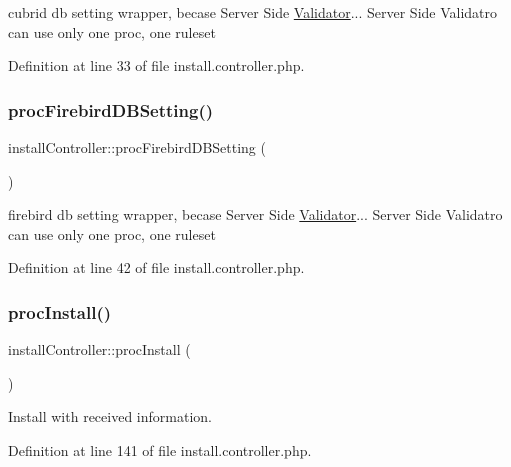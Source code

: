 cubrid db setting wrapper, becase Server Side \hyperlink{classValidator}{Validator}... Server Side Validatro can use only one proc, one ruleset 



Definition at line 33 of file install.\+controller.\+php.

\hypertarget{classinstallController_a243cf71fa5653d7cbf2d5583effefb95}{}\label{classinstallController_a243cf71fa5653d7cbf2d5583effefb95} 
\subsubsection{\texorpdfstring{proc\+Firebird\+D\+B\+Setting()}{procFirebirdDBSetting()}}
{\footnotesize\ttfamily install\+Controller\+::proc\+Firebird\+D\+B\+Setting (\begin{DoxyParamCaption}{ }\end{DoxyParamCaption})}



firebird db setting wrapper, becase Server Side \hyperlink{classValidator}{Validator}... Server Side Validatro can use only one proc, one ruleset 



Definition at line 42 of file install.\+controller.\+php.

\hypertarget{classinstallController_a41026755146b829fe87b83bca3962938}{}\label{classinstallController_a41026755146b829fe87b83bca3962938} 
\subsubsection{\texorpdfstring{proc\+Install()}{procInstall()}}
{\footnotesize\ttfamily install\+Controller\+::proc\+Install (\begin{DoxyParamCaption}{ }\end{DoxyParamCaption})}



Install with received information. 



Definition at line 141 of file install.\+controller.\+php.

\hypertarget{classinstallController_aebbed72d5e11663013b1c1cbe281fcfe}{}\label{classinstallController_aebbed72d5e11663013b1c1cbe281fcfe} 
